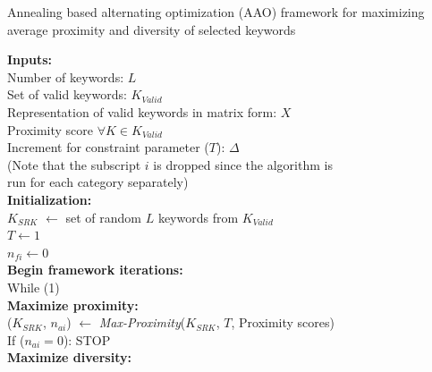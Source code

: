 \begin{algorithm}
\fontsize{8pt}{1em}\selectfont
\caption{Annealing based alternating optimization (AAO) framework for maximizing average proximity and diversity of selected keywords}
\label{algo:AAO}
\textbf{Inputs:} \\ 
\hspace*{2mm}          Number of keywords: $L$ \\ 
\hspace*{2mm}          Set of valid keywords: $K_{Valid}$ \\
\hspace*{2mm}          Representation of valid keywords in matrix form: $X$ \\
\hspace*{2mm}          Proximity score $\forall K \in K_{Valid}$ \\
\hspace*{2mm}          Increment for constraint parameter ($T$): $\Delta$ \\ 	
\hspace*{2mm}   (Note that the subscript $i$ is dropped since the algorithm is  \\ 
\hspace*{2mm}   run for each category separately) \\ 
\textbf{Initialization:} \\ 
\hspace*{2mm}       $K_{SRK}$ $\leftarrow$ set of random $L$ keywords from $K_{Valid}$\\ 
\hspace*{2mm}          $T \leftarrow 1$ \\ 
\hspace*{2mm}          $n_{fi} \leftarrow 0$  \\ 
\textbf{Begin framework iterations: } \\ 
\hspace*{2mm}       While (1) 		 \\ 
\hspace*{6mm}        \textbf{Maximize proximity:} \\ 
\hspace*{6mm}        ($K_{SRK}$, $n_{ai}$) $\leftarrow$ \textit{Max-Proximity}($K_{SRK}$, $T$, Proximity scores) \,\,\,\,\,\,\,\,\,\,\,\,\,\,\,\,\,\,\,\,\,\,\,\,\,\\
\hspace*{6mm}        If ($n_{ai} = 0$):  STOP \\
\hspace*{6mm}        \textbf{Maximize diversity: } \\ 

\end{algorithm}
